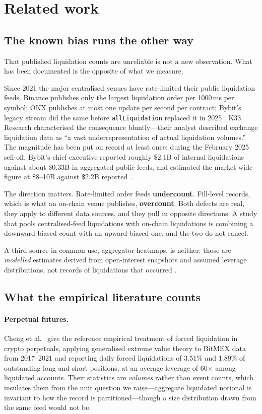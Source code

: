 \documentclass[11pt,a4paper]{article}
\begin{document}
\section{Related work}
\label{sec:related}

\subsection{The known bias runs the other way}

That published liquidation counts are unreliable is not a new observation. What has been
documented is the opposite of what we measure.

Since 2021 the major centralised venues have rate-limited their public liquidation feeds. Binance
publishes only the largest liquidation order per 1000\,ms per symbol; OKX publishes at most one
update per second per contract; Bybit's legacy stream did the same before
\texttt{allLiquidation} replaced it in 2025 \cite{binance,okx,bybit}. K33 Research
\cite{k33} characterised the consequence bluntly---their analyst described exchange liquidation
data as ``a vast underrepresentation of actual liquidation volumes.'' The magnitude has been put
on record at least once: during the February 2025 sell-off, Bybit's chief executive reported
roughly \$2.1B of internal liquidations against about \$0.33B in aggregated public feeds, and
estimated the market-wide figure at \$8--10B against \$2.2B reported~\cite{bybitceo}.

The direction matters. Rate-limited order feeds \textbf{undercount}. Fill-level records, which is
what an on-chain venue publishes, \textbf{overcount}. Both defects are real, they apply to
different data sources, and they pull in opposite directions. A study that pools centralised-feed
liquidations with on-chain liquidations is combining a downward-biased count with an
upward-biased one, and the two do not cancel.

A third source in common use, aggregator heatmaps, is neither: those are \emph{modelled} estimates
derived from open-interest snapshots and assumed leverage distributions, not records of
liquidations that occurred \cite{coinglass}.

\subsection{What the empirical literature counts}

\paragraph{Perpetual futures.} Cheng et al.~\cite{cheng2021} give the reference empirical
treatment of forced liquidation in crypto perpetuals, applying generalised extreme value theory
to BitMEX data from 2017--2021 and reporting daily forced liquidations of 3.51\% and 1.89\% of
outstanding long and short positions, at an average leverage of 60$\times$ among liquidated
accounts. Their statistics are \emph{volumes} rather than event counts, which insulates them from
the unit question we raise---aggregate liquidated notional is invariant to how the record is
partitioned---though a size distribution drawn from the same feed would not be.
\end{document}

